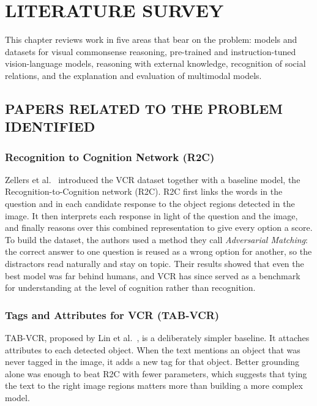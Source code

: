 
\chapter{LITERATURE SURVEY} %
\label{ch:lit}

This chapter reviews work in five areas that bear on the problem: models and datasets for visual commonsense reasoning, pre-trained and instruction-tuned vision-language models, reasoning with external knowledge, recognition of social relations, and the explanation and evaluation of multimodal models.

\section{PAPERS RELATED TO THE PROBLEM IDENTIFIED}

\subsection{Recognition to Cognition Network (R2C)}
Zellers et al.~\cite{zellers2019vcr} introduced the VCR dataset together with a baseline model, the Recognition-to-Cognition network (R2C). R2C first links the words in the question and in each candidate response to the object regions detected in the image. It then interprets each response in light of the question and the image, and finally reasons over this combined representation to give every option a score. To build the dataset, the authors used a method they call \emph{Adversarial Matching}: the correct answer to one question is reused as a wrong option for another, so the distractors read naturally and stay on topic. Their results showed that even the best model was far behind humans, and VCR has since served as a benchmark for understanding at the level of cognition rather than recognition.

\subsection{Tags and Attributes for VCR (TAB-VCR)}
TAB-VCR, proposed by Lin et al.~\cite{lin2019tabvcr}, is a deliberately simpler baseline. It attaches attributes to each detected object. When the text mentions an object that was never tagged in the image, it adds a new tag for that object. Better grounding alone was enough to beat R2C with fewer parameters, which suggests that tying the text to the right image regions matters more than building a more complex model.

